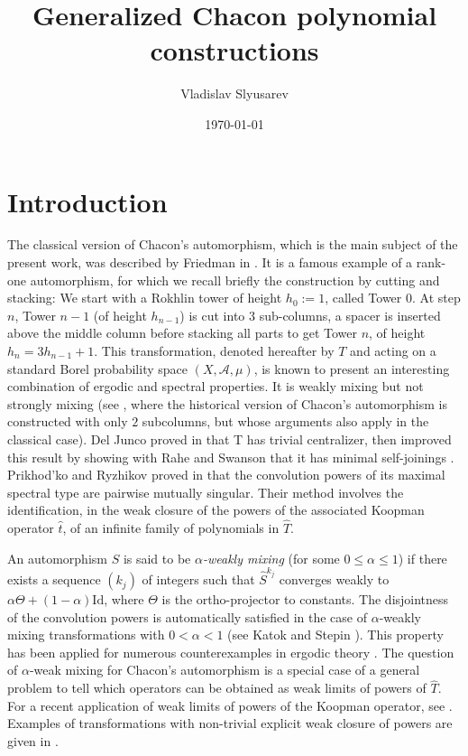 \documentclass[a4paper]{article}
\title{Generalized Chacon polynomial constructions}
\author{Vladislav Slyusarev}
\date{\today}
\theoremstyle{plain}
\theoremstyle{definition}
\begin{document}
\maketitle

\section{Introduction}
The classical version of Chacon’s automorphism, which is the main subject of the
present work, was described by Friedman in \cite{friedman}. It is a famous example of a rank-one automorphism, for which we recall briefly the construction by cutting and stacking:
We start with a Rokhlin tower of height $h_0 := 1$, called Tower 0. At step $n$, Tower
$n-1$ (of height $h_{n-1}$) is cut into $3$ sub-columns, a spacer is inserted above the middle
column before stacking all parts to get Tower $n$, of height $h_n=3h_{n-1}+1$. This
transformation, denoted hereafter by $T$ and acting on a standard Borel probability
space $(X,\mathcal{A},\mu)$, is known to present an interesting combination of ergodic and
spectral properties. It is weakly mixing but not strongly mixing (see \cite{mixing}, where
the historical version of Chacon’s automorphism is constructed with only $2$ subcolumns,
but whose arguments also apply in the classical case). Del Junco proved
in \cite{deljunco} that T has trivial centralizer, then improved this result by showing with
Rahe and Swanson that it has minimal self-joinings \cite{joinings}. Prikhod'ko and Ryzhikov proved in \cite{convolutions} that the convolution powers of its maximal spectral type are pairwise mutually singular. Their method involves the identification, in the weak
closure of the powers of the associated Koopman operator $\hat{t}$, of an infinite family
of polynomials in $\hat{T}$.

An automorphism $S$ is said to be \emph{$\alpha$-weakly mixing} (for some $0\le \alpha \le 1$) if there exists a sequence $(k_j)$ of integers such that $\hat{S}^{k_j}$ converges weakly to $\alpha \Theta + (1-\alpha)\mathrm{Id}$, where $\Theta$ is the ortho-projector to constants. The disjointness of the convolution powers is automatically satisfied in the case of $\alpha$-weakly mixing transformations with $0 < \alpha < 1$ (see Katok \cite{katok} and Stepin \cite{stepin}). This property has been applied for
numerous counterexamples in ergodic theory \cite{deljunco1992}. The question of $\alpha$-weak mixing for Chacon’s automorphism is a special case of a general problem to tell which operators
can be obtained as weak limits of powers of $\hat{T}$. For a recent application of weak
limits of powers of the Koopman operator, see \cite{delarue2012}. Examples of transformations
with non-trivial explicit weak closure of powers are given in \cite{ryzhikov}.
\end{document}

